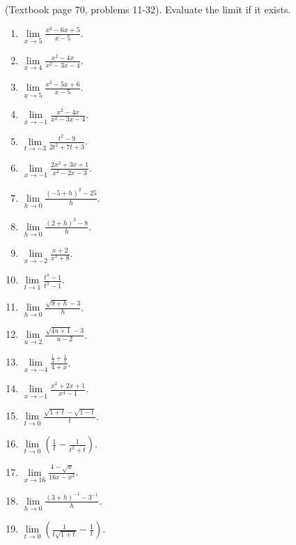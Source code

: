 (Textbook page 70, problems 11-32). 
Evaluate the limit if it exists.
\begin{multicols}{2}
\begin{enumerate}
\item $\displaystyle\lim\limits_{x\to 5}\frac{x^2-6x+5}{x-5} $. 
\item $\displaystyle\lim\limits_{x\to 4}\frac{x^2-4x}{x^2-3x-4} $.
\item $\displaystyle\lim\limits_{x\to 5}\frac{x^2-5x+6}{x-5} $.
\item $\displaystyle\lim\limits_{x\to -1}\frac{x^2-4x}{x^{2}-3x-4} $.
\item $\displaystyle\lim\limits_{t\to -3}\frac{t^2-9}{2t^2+7t+3} $.
\item $\displaystyle\lim\limits_{x\to -1}\frac{2x^2+3x+1}{x^2-2x-3} $.
\item $\displaystyle\lim\limits_{h\to 0}\frac{(-5+h)^2-25}{h} $.
\item $\displaystyle\lim\limits_{h\to 0}\frac{(2+h)^3-8}{h} $.
\item $\displaystyle\lim\limits_{x\to -2}\frac{x+2}{x^3+8} $.
\item $\displaystyle\lim\limits_{t\to 1}\frac{t^4-1}{t^3-1} $.
\item $\displaystyle\lim\limits_{h\to 0}\frac{\sqrt{9+h}-3}{h} $.
\item $\displaystyle\lim\limits_{u\to 2} \frac{\sqrt{4u+1}-3}{u-2}$.
\item $\displaystyle\lim\limits_{x\to -4} \frac{\frac{1}{4}+ \frac{1}{x}} {4+x}$.
\item $\displaystyle\lim\limits_{x\to -1} \frac{x^2+2x+1}{x^4-1}$.
\item $\displaystyle\lim\limits_{t\to 0} \frac{\sqrt{1+t}- \sqrt{1-t}}{t}$.
\item $\displaystyle\lim\limits_{t\to 0}\left(\frac{1}t -\frac{1}{t^2+t}\right)$.
\item $\displaystyle\lim\limits_{x\to 16} \frac{4-\sqrt{x}}{16x-x^2}$.
\item $\displaystyle\lim\limits_{h \to 0}\frac{(3+h)^{-1}-3^{-1}}{h} $.
\item $\displaystyle\lim\limits_{t\to 0} \left(\frac{1}{t\sqrt{1+t}}-\frac{1}{t} \right)$.

\end{enumerate}
\end{multicols}
